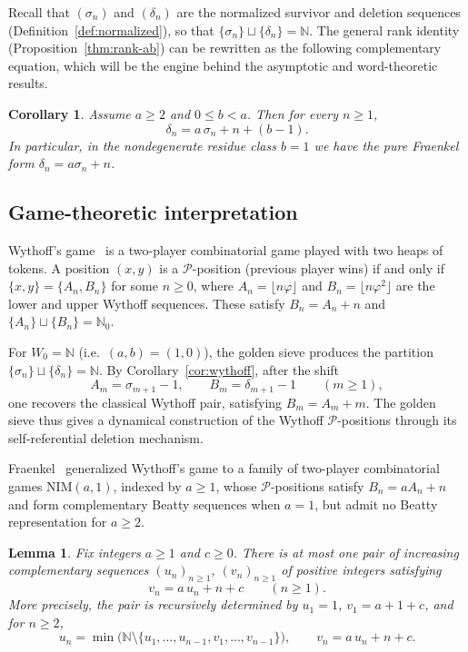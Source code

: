 \documentclass[11pt]{article}
\numberwithin{equation}{section}
\theoremstyle{plain}
\newtheorem{lemma}[theorem]{Lemma}
\newtheorem{corollary}[theorem]{Corollary}
\theoremstyle{definition}
\theoremstyle{remark}
\newcommand{\N}{\mathbb{N}}
\begin{document}
Recall that $(\sigma_n)$ and $(\delta_n)$ are the normalized survivor and
deletion sequences (Definition~\ref{def:normalized}), so that
$\{\sigma_n\}\sqcup\{\delta_n\}=\N$.
The general rank identity (Proposition~\ref{thm:rank-ab}) can be rewritten as the
following complementary equation, which will be the engine behind
the asymptotic and word-theoretic results.

\begin{corollary}\label{cor:fraenkel-oce}
Assume $a\ge2$ and $0\le b<a$. Then for every $n\ge1$,
\begin{equation}\label{eq:fraenkel-oce}
  \delta_n = a\,\sigma_n + n + (b-1).
\end{equation}
In particular, in the nondegenerate residue class $b=1$ we have the pure
Fraenkel form $\delta_n=a\sigma_n+n$.
\end{corollary}

\subsection{Game-theoretic interpretation}

Wythoff's game~\cite{Wythoff1907} is a two-player combinatorial game played
with two heaps of tokens. A position $(x,y)$ is a $\mathcal{P}$-position
(previous player wins) if and only if $\{x,y\}=\{A_n,B_n\}$ for some
$n\ge0$, where $A_n=\lfloor n\varphi\rfloor$ and
$B_n=\lfloor n\varphi^2\rfloor$ are the lower and upper Wythoff
sequences.  These satisfy $B_n=A_n+n$ and
$\{A_n\}\sqcup\{B_n\}=\N_0$.

For $W_0=\N$ (i.e.\ $(a,b)=(1,0)$), the golden sieve produces the
partition $\{\sigma_n\}\sqcup\{\delta_n\}=\N$.
By Corollary~\ref{cor:wythoff}, after the shift
\[
  A_m=\sigma_{m+1}-1, \qquad B_m=\delta_{m+1}-1 \qquad (m\ge1),
\]
one recovers the classical Wythoff pair, satisfying $B_m=A_m+m$.
The golden sieve thus gives a dynamical construction of the Wythoff
$\mathcal{P}$-positions through its self-referential deletion mechanism.

Fraenkel~\cite{Fraenkel1969,Fraenkel1998} generalized Wythoff's game to
a family of two-player combinatorial games $\mathrm{NIM}(a,1)$, indexed by $a\ge1$, whose
$\mathcal{P}$-positions satisfy $B_n = a A_n + n$ and form complementary
Beatty sequences when $a=1$, but admit no Beatty representation for
$a\ge2$.

\begin{lemma}\label{lem:mex-uniqueness}
Fix integers $a\ge1$ and $c\ge0$.  There is at most one pair of increasing
complementary sequences $(u_n)_{n\ge1}$, $(v_n)_{n\ge1}$ of positive integers
satisfying
\[
  v_n = a\,u_n + n + c \qquad (n\ge1).
\]
More precisely, the pair is recursively determined by $u_1=1$,
$v_1=a+1+c$, and for $n\ge2$,
\[
  u_n = \min\bigl(\N\setminus\{u_1,\dots,u_{n-1},v_1,\dots,v_{n-1}\}\bigr),
  \qquad
  v_n = a\,u_n+n+c.
\]
\end{lemma}
\end{document}
